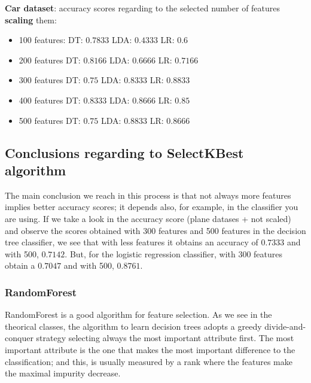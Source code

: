 \documentclass{article} %
\begin{document}
\textbf{Car dataset}: accuracy scores regarding to the selected number of features \textbf{scaling} them:
\begin{multicols}{2}
\begin{itemize}
    \item 100 features:
    \subitem DT: $0.7833$
    \subitem LDA: $0.4333$
    \subitem LR: $0.6$
    \item 200 features
    \subitem DT: $0.8166$
    \subitem LDA: $0.6666$
    \subitem LR: $0.7166$
    \item 300 features
    \subitem DT: $0.75$
    \subitem LDA: $0.8333$
    \subitem LR: $0.8833$
    \item 400 features
    \subitem DT: $0.8333$
    \subitem LDA: $0.8666$
    \subitem LR: $0.85$
    \item 500 features
    \subitem DT: $0.75$
    \subitem LDA: $0.8833$
    \subitem LR: $0.8666$
\end{itemize}
\end{multicols}

\subsection{Conclusions regarding to SelectKBest algorithm}

The main conclusion we reach in this process is that not always more features implies better accuracy scores; it depends also, for example, in the classifier you are using. If we take a look in the accuracy score (plane datases + not scaled) and observe the scores obtained with 300 features and 500 features in the decision tree classifier, we see that with less features it obtains an accuracy of $0.7333$ and with 500, $0.7142$. But, for the logistic regression classifier, with 300 features obtain a $0.7047$ and with 500, $0.8761$.

\subsubsection{RandomForest}

RandomForest is a good algorithm for feature selection. As we see in the theorical classes, the algorithm to learn decision trees adopts a greedy divide-and-conquer strategy selecting always the most important attribute first. The most important attribute is the one that makes the most important difference to the classification; and this, is usually measured by a rank where the features make the maximal impurity decrease.
\end{document}
